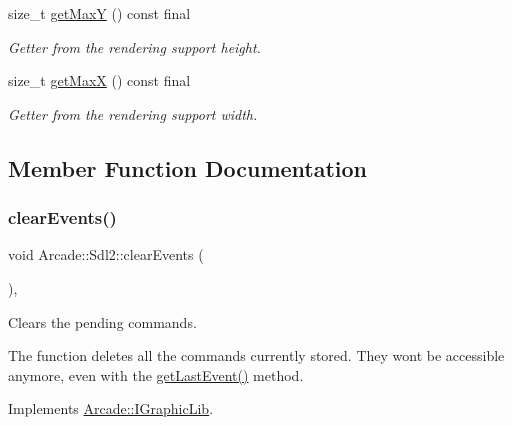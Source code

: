 \begin{DoxyCompactItemize}
size\+\_\+t \hyperlink{class_arcade_1_1_sdl2_a958b3611cb0f7db90eeca5c9c4eaed59}{get\+MaxY} () const final
\begin{DoxyCompactList}\small\item\em Getter from the rendering support height. \end{DoxyCompactList}\item 
size\+\_\+t \hyperlink{class_arcade_1_1_sdl2_a9e9e70db8a77c2dee10e2227c70415e3}{get\+MaxX} () const final
\begin{DoxyCompactList}\small\item\em Getter from the rendering support width. \end{DoxyCompactList}\end{DoxyCompactItemize}


\subsection{Member Function Documentation}
\mbox{\label{class_arcade_1_1_sdl2_a92f016d43686b195673aea7f3446d0a1}} 
\subsubsection{\texorpdfstring{clear\+Events()}{clearEvents()}}
{\footnotesize\ttfamily void Arcade\+::\+Sdl2\+::clear\+Events (\begin{DoxyParamCaption}{ }\end{DoxyParamCaption})\hspace{0.3cm}{\ttfamily [final]}, {\ttfamily [virtual]}}



Clears the pending commands. 

The function deletes all the commands currently stored. They wont be accessible anymore, even with the \hyperlink{class_arcade_1_1_sdl2_a6d5bda09e7705c6ccef7451694621247}{get\+Last\+Event()} method. 

Implements \hyperlink{class_arcade_1_1_i_graphic_lib_a78691f8f9433b2af945576231534c1e3}{Arcade\+::\+I\+Graphic\+Lib}.

\mbox{\label{class_arcade_1_1_sdl2_a312397e628bbf14d8532e2a13575c7ab}} 
